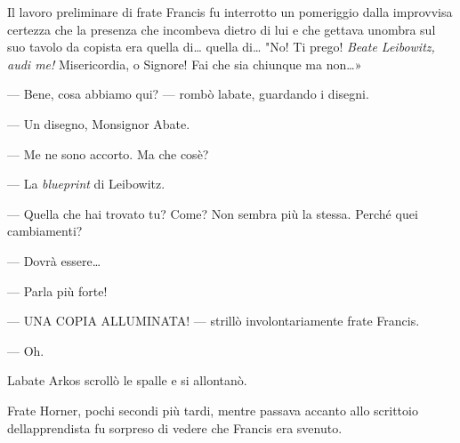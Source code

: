 Il lavoro preliminare di frate Francis fu interrotto un pomeriggio dalla
improvvisa certezza che la presenza che incombeva dietro di lui e che
gettava un\textquotesingle ombra sul suo tavolo da copista era quella
di\ldots{} quella di\ldots{} "No! Ti prego! \emph{Beate Leibowitz, audi
	me!} Misericordia, o Signore! Fai che sia chiunque ma non\ldots»

--- Bene, cosa abbiamo qui? --- rombò l\textquotesingle abate, guardando
i disegni.

--- Un disegno, Monsignor Abate.

--- Me ne sono accorto. Ma che cos\textquotesingle è?

--- La \emph{blueprint} di Leibowitz.

--- Quella che hai trovato tu? Come? Non sembra più la stessa. Perché
quei cambiamenti?

--- Dovrà essere\ldots{}

--- Parla più forte!

--- UNA COPIA ALLUMINATA! --- strillò involontariamente frate Francis.

--- Oh.

L\textquotesingle abate Arkos scrollò le spalle e si allontanò.

Frate Horner, pochi secondi più tardi, mentre passava accanto allo
scrittoio dell\textquotesingle apprendista fu sorpreso di vedere che
Francis era svenuto.

